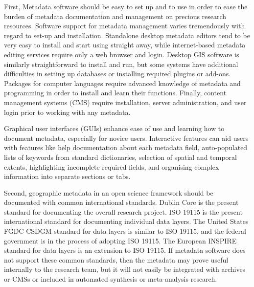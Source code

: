\documentclass{isprs} %
\begin{document}
First, Metadata software should be easy to set up and to use in order to ease the burden of metadata documentation and management on precious research resources.
Software support for metadata management varies tremendously with regard to set-up and installation.
Standalone desktop metadata editors tend to be very easy to install and start using straight away, while internet-based metadata editing services require only a web browser and login.
Desktop GIS software is similarly straightforward to install and run, but some systems have additional difficulties in setting up databases or installing required plugins or add-ons.
Packages for computer languages require advanced knowledge of metadata and programming in order to install and learn their functions.
Finally, content management systems (CMS) require installation, server administration, and user login prior to working with any metadata. 

Graphical user interfaces (GUIs) enhance ease of use and learning how to document metadata, especially for novice users.
Interactive features can aid users with features like help documentation about each metadata field, auto-populated lists of keywords from standard dictionaries, selection of spatial and temporal extents, highlighting incomplete required fields, and organising complex information into separate sections or tabs.

Second, geographic metadata in an open science framework should be documented with common international standards. 
Dublin Core is the present standard for documenting the overall research project. 
ISO 19115 is the present international standard for documenting individual data layers.
The United States FGDC CSDGM standard for data layers is similar to ISO 19115, and the federal government is in the process of adopting ISO 19115.
The European INSPIRE standard for data layers is an extension to ISO 19115. 
If metadata software does not support these common standards, then the metadata may prove useful internally to the research team, but it will not easily be integrated with archives or CMSs or included in automated synthesis or meta-analysis research.
\end{document}
